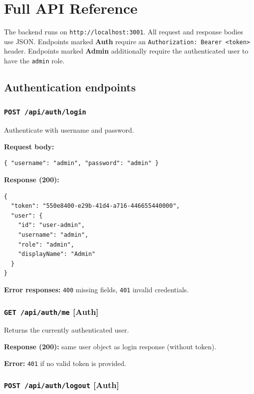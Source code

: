 \documentclass[12pt,a4paper]{article}
\begin{document}
\section{Full API Reference}
\label{sec:api}

The backend runs on \texttt{http://localhost:3001}. All request and response bodies use JSON. Endpoints marked \textbf{Auth} require an \texttt{Authorization: Bearer <token>} header. Endpoints marked \textbf{Admin} additionally require the authenticated user to have the \texttt{admin} role.

\subsection{Authentication endpoints}

\subsubsection{\texttt{POST /api/auth/login}}

Authenticate with username and password.

\textbf{Request body:}
\begin{lstlisting}[language={}]
{ "username": "admin", "password": "admin" }
\end{lstlisting}

\textbf{Response (200):}
\begin{lstlisting}[language={}]
{
  "token": "550e8400-e29b-41d4-a716-446655440000",
  "user": {
    "id": "user-admin",
    "username": "admin",
    "role": "admin",
    "displayName": "Admin"
  }
}
\end{lstlisting}

\textbf{Error responses:} \texttt{400} missing fields, \texttt{401} invalid credentials.

\subsubsection{\texttt{GET /api/auth/me} \textnormal{\textbf{[Auth]}}}

Returns the currently authenticated user.

\textbf{Response (200):} same user object as login response (without token).

\textbf{Error:} \texttt{401} if no valid token is provided.

\subsubsection{\texttt{POST /api/auth/logout} \textnormal{\textbf{[Auth]}}}
\end{document}
